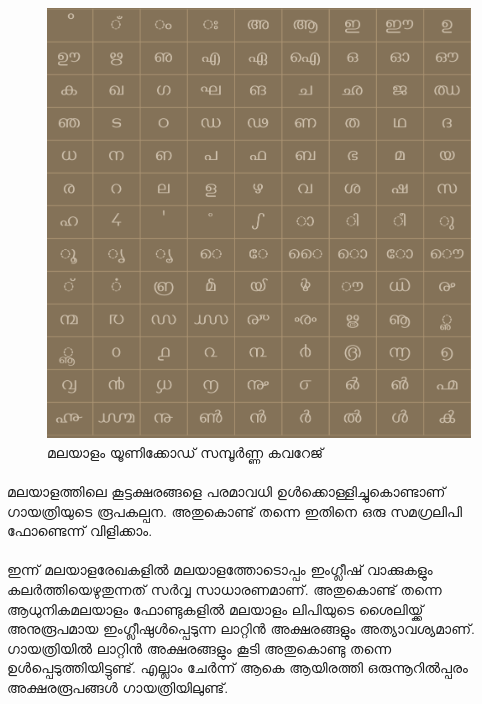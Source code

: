 \documentclass[a4paper, 12pt]{report}
\begin{document}
	\begin{figure}
		\begin{centering}
			\includegraphics[width=1.0\textwidth]{ml-unicode.png}
			\caption{മലയാളം യൂണിക്കോഡ് സമ്പൂര്‍ണ്ണ കവറേജ്}
			\label{unicode}
		\end{centering}
	\end{figure}
	
	\paragraph{}
	മലയാളത്തിലെ കൂട്ടക്ഷരങ്ങളെ പരമാവധി ഉള്‍ക്കൊള്ളിച്ചുകൊണ്ടാണ് ഗായത്രിയുടെ രൂപകല്പന‍. അതുകൊണ്ട് തന്നെ ഇതിനെ ഒരു സമഗ്രലിപി ഫോണ്ടെന്ന് വിളിക്കാം.
	
	\paragraph{}
	ഇന്ന് മലയാളരേഖകളില്‍ മലയാളത്തോടൊപ്പം ഇംഗ്ലീഷ് വാക്കുകളും കലര്‍ത്തിയെഴുതുന്നത് സര്‍വ്വ സാധാരണമാണ്. അതുകൊണ്ട് തന്നെ ആധുനികമലയാളം ഫോണ്ടുകളില്‍ മലയാളം ലിപിയുടെ ശൈലിയ്ക്ക് അനുരൂപമായ ഇംഗ്ലീഷുള്‍പ്പെടുന്ന ലാറ്റിന്‍ അക്ഷരങ്ങളും അത്യാവശ്യമാണ്. ഗായത്രിയിൽ ലാറ്റിന്‍ അക്ഷരങ്ങളും കൂടി അതുകൊണ്ടു തന്നെ ഉള്‍പ്പെടുത്തിയിട്ടുണ്ട്.  എല്ലാം ചേര്‍ന്ന് ആകെ ആയിരത്തി ഒരുന്നൂറിൽപ്പരം അക്ഷരരൂപങ്ങൾ‍ ഗായത്രിയിലുണ്ട്. 
	
\end{document}
